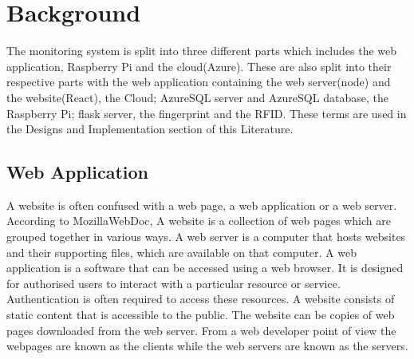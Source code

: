 \chapter{Background}
 
 
The monitoring system is split into three different parts which includes the web application, Raspberry Pi and the cloud(Azure). These are also split into their respective parts with the web application containing the web server(node) and the website(React), the Cloud; AzureSQL server and AzureSQL database, the Raspberry Pi; flask server, the fingerprint and the \gls{RFID}. These terms are used in the Designs and Implementation section of this Literature.
 
\section{Web Application}
A website is often confused with a web page, a web application or a web server. According to MozillaWebDoc, A website is a collection of web pages which are grouped together in various ways. A web server is a computer that hosts websites and their supporting files, which are available on that computer. A web application is a software that can be accessed using a web browser.\cite{Whatisth32:online} It is designed for authorised users to interact with a particular resource or service. Authentication is often required to access these resources\label{authentication}. A website consists of static content that is accessible to the public. The website can be copies of web pages downloaded from the web server. From a web developer point of view the webpages are known as the clients while the web servers are known as the servers.
